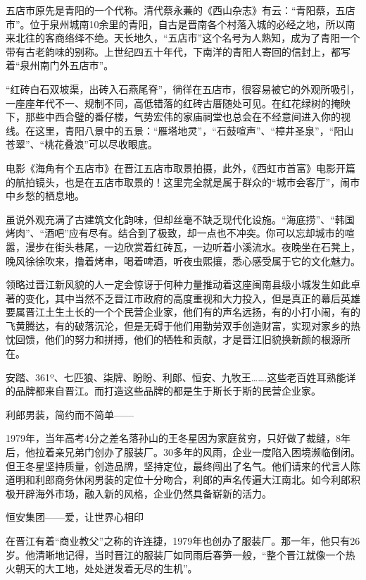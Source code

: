 \documentclass[]{book}
\begin{document}
五店市原先是青阳的一个代称。清代蔡永蒹的《西山杂志》有云：``青阳蔡，五店市''。位于泉州城南10余里的青阳，自古是晋南各个村落入城的必经之地，所以南来北往的客商络绎不绝。天长地久，``五店市''这个名号为人熟知，成为了青阳一个带有古老韵味的别称。上世纪四五十年代，下南洋的青阳人寄回的信封上，都写着``泉州南门外五店市''。

``红砖白石双坡渠，出砖入石燕尾脊''，徜徉在五店市，很容易被它的外观所吸引，一座座年代不一、规制不同，高低错落的红砖古厝随处可见。在红花绿树的掩映下，那些中西合璧的番仔楼，气势宏伟的家庙祠堂也总会在不经意间进入你的视线。在这里，青阳八景中的五景：``雁塔地灵''，``石鼓喧声''、``樟井圣泉''，``阳山苍翠''、``桃花叠浪''可以尽收眼底。

电影《海角有个五店市》在晋江五店市取景拍摄，此外，《西虹市首富》电影开篇的航拍镜头，也是在五店市取景的！这里完全就是属于群众的``城市会客厅''，闹市中乡愁的栖息地。

虽说外观充满了古建筑文化韵味，但却丝毫不缺乏现代化设施。``海底捞''、``韩国烤肉''、``酒吧''应有尽有。结合到了极致，却一点也不冲突。你可以忘却城市的喧嚣，漫步在街头巷尾，一边欣赏着红砖瓦，一边听着小溪流水。夜晚坐在石凳上，晚风徐徐吹来，撸着烤串，喝着啤酒，听夜虫熙攘，悉心感受属于它的文化魅力。

领略过晋江新风貌的人一定会惊讶于何种力量推动着这座闽南县级小城发生如此卓著的变化，其中当然不乏晋江市政府的高度重视和大力投入，但是真正的幕后英雄要属晋江土生土长的一个个民营企业家，他们有的声名远扬，有的小打小闹，有的飞黄腾达，有的破落沉沦，但是无碍于他们用勤劳双手创造财富，实现对家乡的热忱回馈，他们的努力和拼搏，他们的牺牲和贡献，才是晋江旧貌换新颜的根源所在。

安踏、361º、七匹狼、柒牌、盼盼、利郎、恒安、九牧王\ldots{}\ldots{}.这些老百姓耳熟能详的品牌都来自晋江。而打造这些品牌的都是生于斯长于斯的民营企业家。

利郎男装，简约而不简单------

1979年，当年高考4分之差名落孙山的王冬星因为家庭贫穷，只好做了裁缝，8年后，他拉着亲兄弟门创办了服装厂。30多年的风雨，企业一度陷入困境濒临倒闭。但王冬星坚持质量，创造品牌，坚持定位，最终闯出了名气。他们请来的代言人陈道明和利郎商务休闲男装的定位十分吻合，利郎的声名传遍大江南北。如今利郎积极开辟海外市场，融入新的风格，企业仍然具备崭新的活力。

恒安集团------爱，让世界心相印

在晋江有着``商业教父''之称的许连捷，1979年也创办了服装厂。那一年，他只有26岁。他清晰地记得，当时晋江的服装厂如同雨后春笋一般，``整个晋江就像一个热火朝天的大工地，处处迸发着无尽的生机''。
\end{document}

